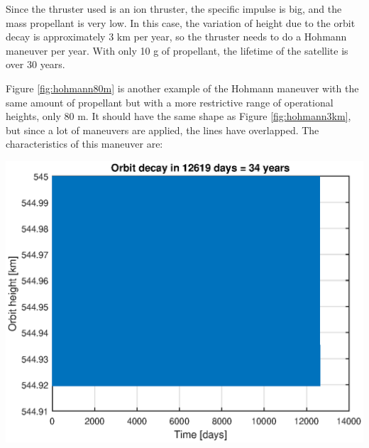 Since the thruster used is an ion thruster, the specific impulse is big, and the mass propellant is very low. In this case, the variation of height due to the orbit decay is approximately 3 km per year, so the thruster needs to do a Hohmann maneuver per year. With only 10 g of propellant, the lifetime of the satellite is over 30 years.

Figure \ref{fig:hohmann80m} is another example of the Hohmann maneuver with the same amount of propellant but with a more restrictive range of operational heights, only 80 m. It should have the same shape as Figure \ref{fig:hohmann3km}, but since a lot of maneuvers are applied, the lines have overlapped. The characteristics of this maneuver are:

\begin{minipage}{\textwidth}
\begin{minipage}[b]{0.49\textwidth}
\centering
\includegraphics[scale=0.4]{ThrustersDrag/thrust80m.eps}
\label{fig:hohmann80m}
\end{minipage}
\hfill
{}
\end{minipage}

